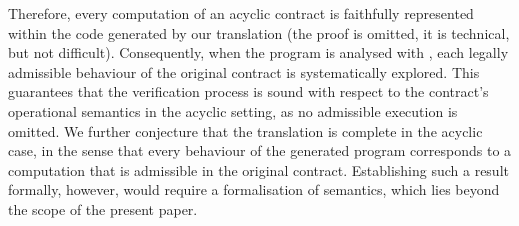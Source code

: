 Therefore, every computation of an acyclic {\Stipula} contract is
faithfully represented within the {\Java} code generated by our
translation
%
(the proof is omitted, it is technical, but not difficult).
Consequently, when the program is analysed with {\KeY}, each legally
admissible behaviour of the original contract is systematically
explored. This guarantees that the verification process is sound with
respect to the contract's operational semantics in the acyclic
setting, as no admissible execution is omitted.  We further conjecture
that the translation is complete in the acyclic case, in the sense
that every behaviour of the generated {\Java} program corresponds to a
computation that is admissible in the original {\Stipula}
contract. Establishing such a result formally, however, would require
a formalisation of {\Java} semantics, which lies beyond the
scope of the present paper. 


